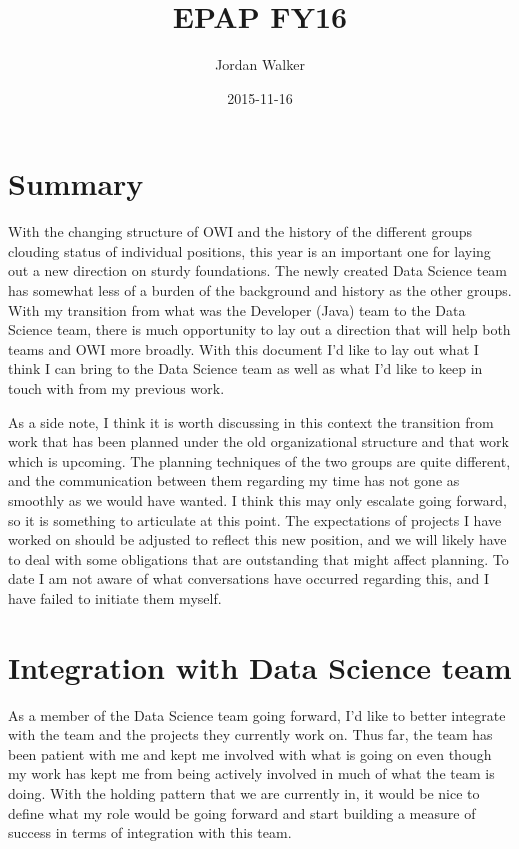 \documentclass{article}
\title{EPAP FY16}
\author{Jordan Walker}
\date{2015-11-16}
\begin{document}
\maketitle

\section{Summary}

With the changing structure of OWI and the history of the different groups clouding status of individual positions, this year is an important one for laying out a new direction on sturdy foundations.
The newly created Data Science team has somewhat less of a burden of the background and history as the other groups.
With my transition from what was the Developer (Java) team to the Data Science team, there is much opportunity to lay out a direction that will help both teams and OWI more broadly.
With this document I'd like to lay out what I think I can bring to the Data Science team as well as what I'd like to keep in touch with from my previous work.

As a side note, I think it is worth discussing in this context the transition from work that has been planned under the old organizational structure and that work which is upcoming.
The planning techniques of the two groups are quite different, and the communication between them regarding my time has not gone as smoothly as we would have wanted.
I think this may only escalate going forward, so it is something to articulate at this point.
The expectations of projects I have worked on should be adjusted to reflect this new position, and we will likely have to deal with some obligations that are outstanding that might affect planning.
To date I am not aware of what conversations have occurred regarding this, and I have failed to initiate them myself.

\section{Integration with Data Science team}

As a member of the Data Science team going forward, I'd like to better integrate with the team and the projects they currently work on.
Thus far, the team has been patient with me and kept me involved with what is going on even though my work has kept me from being actively involved in much of what the team is doing.
With the holding pattern that we are currently in, it would be nice to define what my role would be going forward and start building a measure of success in terms of integration with this team.
\end{document}
